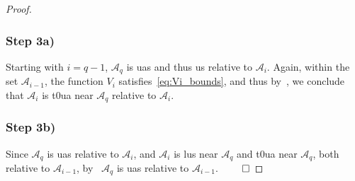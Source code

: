 \documentclass[../main.tex]{subfiles}
\begin{document}
\begin{proof}
\vspace{-7pt}
\subsubsection{Step 3a)} Starting with $i=q-1$, $\mathcal{A}_q$ is \gls{uas} and thus \gls{us} relative to $\mathcal{A}_{i}$. Again, within the set $\mathcal{A}_{i-1}$, the function $V_i$ satisfies~\eqref{eq:Vi_bounds}, and thus by~\cite[Corollary 29]{Maggiore2023}, we conclude that $\mathcal{A}_{i}$ is \gls{t0ua} near $\mathcal{A}_q$ relative to $\mathcal{A}_{i}$.

\vspace{-7pt}
\subsubsection{Step 3b)} Since $\mathcal{A}_q$ is \gls{uas} relative to $\mathcal{A}_i$, and 
$\mathcal{A}_i$ is \gls{lus} near $\mathcal{A}_q$ and \gls{t0ua} near $\mathcal{A}_q$, both relative to $\mathcal{A}_{i-1}$, by~\cite[Theorem 18]{Maggiore2023} $\mathcal{A}_q$ is \gls{uas} relative to $\mathcal{A}_{i-1}$.
\hfill$\qed$
\end{proof}
    





\vspace{-10pt}
\end{document}
